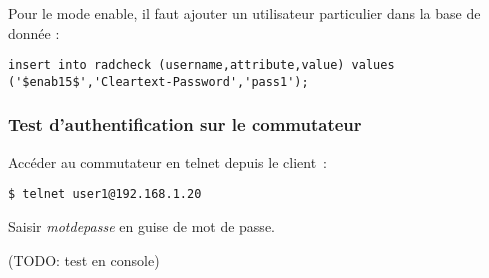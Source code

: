 Pour le mode enable, il faut ajouter un utilisateur particulier dans la base de donnée :
\begin{verbatim}
insert into radcheck (username,attribute,value) values ('$enab15$','Cleartext-Password','pass1');
\end{verbatim}

\subsubsection{Test d'authentification sur le commutateur}

Accéder au commutateur en telnet depuis le client~:
\begin{verbatim}
$ telnet user1@192.168.1.20
\end{verbatim}

Saisir \emph{motdepasse} en guise de mot de passe.

(TODO: test en console)

